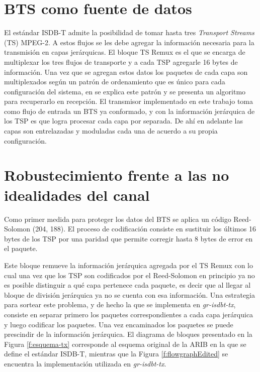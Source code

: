 \section{BTS como fuente de datos}

El est\'andar ISDB-T admite la posibilidad de tomar hasta tres \textit{Transport Streams} (TS) MPEG-2. A estos flujos se les debe agregar la informaci\'on necesaria para la transmisi\'on en capas jer\'arquicas. El bloque TS Remux es el que se encarga de multiplexar los tres flujos de transporte y a cada TSP agregarle 16 bytes de informaci\'on. 
Una vez que se agregan estos datos los paquetes de cada capa son multiplexados seg\'un un patr\'on de ordenamiento que es \'unico para cada configuraci\'on del sistema, en \cite{multiplex-pattern} se explica este patr\'on y se presenta un algoritmo para recuperarlo en recepci\'on. El transmisor implementado en este trabajo toma como flujo de entrada un BTS ya conformado, y con la informaci\'on jer\'arquica de los TSP es que logra procesar cada capa por separada. De ah\'i en adelante las capas son entrelazadas y moduladas cada una de acuerdo a su propia configuraci\'on. 

\section{Robustecimiento frente a las no idealidades del canal}

Como primer medida para proteger los datos del BTS se aplica un c\'odigo Reed-Solomon (204, 188). El proceso de codificaci\'on consiste en sustituir los \'ultimos 16 bytes de los TSP por una paridad que permite corregir hasta 8 bytes de error en el paquete. 

Este bloque remueve la informaci\'on jer\'arquica agregada por el TS Remux con lo cual una vez que los TSP son codificados por el Reed-Solomon en principio ya no es posible distinguir a qu\'e capa pertenece cada paquete, es decir que al llegar al bloque de divisi\'on jer\'arquica ya no se cuenta con esa informaci\'on. Una estrategia para sortear este problema, y de hecho la que se implementa en \textit{gr-isdbt-tx}, consiste en separar primero los paquetes correspondientes a cada capa jer\'arquica y luego codificar los paquetes. Una vez encaminados los paquetes se puede prescindir de la informaci\'on jer\'arquica. El diagrama de bloques presentado en la Figura \ref{f:esquema-tx} corresponde al esquema original de la ARIB en la que se define el est\'andar ISDB-T, mientras que la Figura \ref{f:flowgraphEdited} se encuentra la implementaci\'on utilizada en \textit{gr-isdbt-tx}. 

